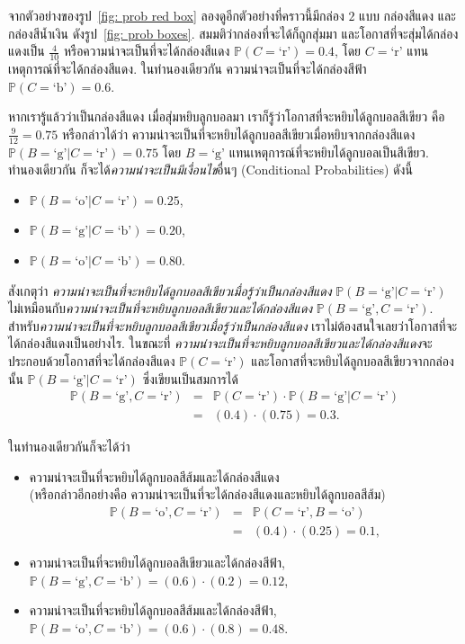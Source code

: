 จากตัวอย่างของรูป~\ref{fig: prob red box} 
ลองดูอีกตัวอย่างที่คราวนี้มีกล่อง $2$ แบบ กล่องสีแดง และ กล่องสีน้ำเงิน ดังรูป~\ref{fig: prob boxes}.
สมมติว่ากล่องที่จะได้ก็ถูกสุ่มมา 
และโอกาสที่จะสุ่มได้กล่องแดงเป็น $\frac{4}{10}$ หรือความน่าจะเป็นที่จะได้กล่องสีแดง $\mathbb{P}(C = \mbox{`r'}) = 0.4$,
โดย $C = \mbox{`r'}$ แทนเหตุการณ์ที่จะได้กล่องสีแดง.
ในทำนองเดียวกัน ความน่าจะเป็นที่จะได้กล่องสีฟ้า $\mathbb{P}(C = \mbox{`b'}) = 0.6$.

หากเรารู้แล้วว่าเป็นกล่องสีแดง เมื่อสุ่มหยิบลูกบอลมา เราก็รู้ว่าโอกาสที่จะหยิบได้ลูกบอลสีเขียว คือ $\frac{9}{12} = 0.75$ 
หรือกล่าวได้ว่า ความน่าจะเป็นที่จะหยิบได้ลูกบอลสีเขียวเมื่อหยิบจากกล่องสีแดง $\mathbb{P}(B = \mbox{`g'}|C = \mbox{`r'}) = 0.75$
โดย $B = \mbox{`g'}$ แทนเหตุการณ์ที่จะหยิบได้ลูกบอลเป็นสีเขียว.
ทำนองเดียวกัน ก็จะได้\textit{ความน่าจะเป็นมีเงื่อนไข}อื่นๆ (Conditional Probabilities) ดังนี้
\begin{itemize}
\item $\mathbb{P}(B = \mbox{`o'}|C = \mbox{`r'}) = 0.25$,
\item $\mathbb{P}(B = \mbox{`g'}|C = \mbox{`b'}) = 0.20$, 
\item $\mathbb{P}(B = \mbox{`o'}|C = \mbox{`b'}) = 0.80$.
\end{itemize}

สังเกตุว่า \textit{ความน่าจะเป็นที่จะหยิบได้ลูกบอลสีเขียวเมื่อรู้ว่าเป็นกล่องสีแดง} $\mathbb{P}(B = \mbox{`g'}|C = \mbox{`r'})$ ไม่เหมือนกับ\textit{ความน่าจะเป็นที่จะหยิบลูกบอลสีเขียวและได้กล่องสีแดง} $\mathbb{P}(B = \mbox{`g'}, C = \mbox{`r'})$.
สำหรับ\textit{ความน่าจะเป็นที่จะหยิบลูกบอลสีเขียวเมื่อรู้ว่าเป็นกล่องสีแดง} 
เราไม่ต้องสนใจเลยว่าโอกาสที่จะได้กล่องสีแดงเป็นอย่างไร.
ในขณะที่ \textit{ความน่าจะเป็นที่จะหยิบลูกบอลสีเขียวและได้กล่องสีแดง}จะประกอบด้วยโอกาสที่จะได้กล่องสีแดง $\mathbb{P}(C = \mbox{`r'})$ และโอกาสที่จะหยิบได้ลูกบอลสีเขียวจากกล่องนั้น $\mathbb{P}(B = \mbox{`g'}|C = \mbox{`r'})$
ซึ่งเขียนเป็นสมการได้
\begin{eqnarray}
  \mathbb{P}(B = \mbox{`g'}, C = \mbox{`r'}) &=& \mathbb{P}(C = \mbox{`r'}) \cdot \mathbb{P}(B = \mbox{`g'}|C = \mbox{`r'})
\label{eq: prob cond prob Balls and Crates} \\
  &=& (0.4) \cdot (0.75) = 0.3
\nonumber .
\end{eqnarray}

ในทำนองเดียวกันก็จะได้ว่า
\begin{itemize}
\item ความน่าจะเป็นที่จะหยิบได้ลูกบอลสีส้มและได้กล่องสีแดง
\\(หรือกล่าวอีกอย่างคือ ความน่าจะเป็นที่จะได้กล่องสีแดงและหยิบได้ลูกบอลสีส้ม)
\begin{eqnarray}
\mathbb{P}(B = \mbox{`o'},C = \mbox{`r'})
&=& \mathbb{P}(C = \mbox{`r'},B = \mbox{`o'})
\nonumber \\
&=& (0.4) \cdot (0.25) = 0.1
\nonumber ,
\end{eqnarray}
\item ความน่าจะเป็นที่จะหยิบได้ลูกบอลสีเขียวและได้กล่องสีฟ้า, $\mathbb{P}(B = \mbox{`g'},C = \mbox{`b'}) = (0.6) \cdot (0.2) = 0.12$,
\item ความน่าจะเป็นที่จะหยิบได้ลูกบอลสีส้มและได้กล่องสีฟ้า, $\mathbb{P}(B = \mbox{`o'},C = \mbox{`b'}) = (0.6) \cdot (0.8) = 0.48$.
\end{itemize}

